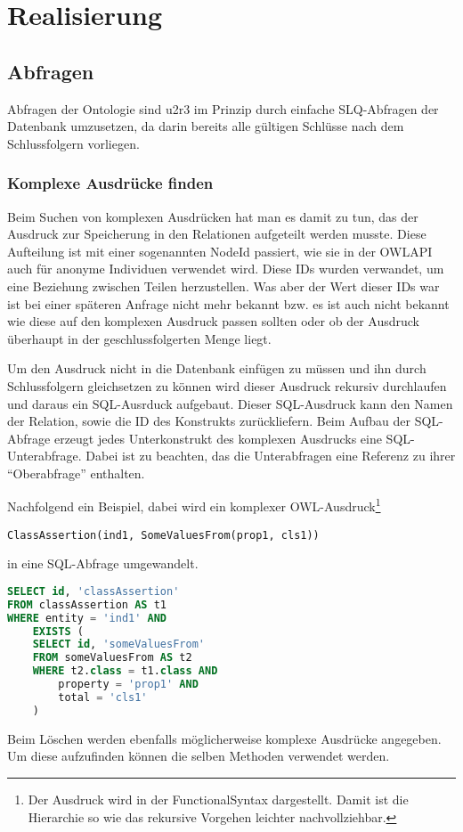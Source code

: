 \chapter{Realisierung}



\section{Abfragen}

Abfragen der Ontologie sind u2r3 im Prinzip durch einfache SLQ-Abfragen der Datenbank umzusetzen, da darin bereits alle gültigen Schlüsse nach dem Schlussfolgern vorliegen.

\subsection{Komplexe Ausdrücke finden}
Beim Suchen von komplexen Ausdrücken hat man es damit zu tun, das der Ausdruck zur Speicherung in den Relationen aufgeteilt werden musste. Diese Aufteilung ist mit einer sogenannten NodeId passiert, wie sie in der OWLAPI auch für anonyme Individuen verwendet wird. Diese IDs wurden verwandet, um eine Beziehung zwischen Teilen herzustellen. Was aber der Wert dieser IDs war ist bei einer späteren Anfrage nicht mehr bekannt bzw. es ist auch nicht bekannt wie diese auf den komplexen Ausdruck passen sollten oder ob der Ausdruck überhaupt in der geschlussfolgerten Menge liegt.

Um den Ausdruck nicht in die Datenbank einfügen zu müssen und ihn durch Schlussfolgern gleichsetzen zu können wird dieser Ausdruck rekursiv durchlaufen und daraus ein SQL-Ausrduck aufgebaut. Dieser SQL-Ausdruck kann den Namen der Relation, sowie die ID des Konstrukts zurückliefern. Beim Aufbau der SQL-Abfrage erzeugt jedes Unterkonstrukt des komplexen Ausdrucks eine SQL-Unterabfrage. Dabei ist zu beachten, das die Unterabfragen eine Referenz zu ihrer ``Oberabfrage'' enthalten.

Nachfolgend ein Beispiel, dabei wird ein komplexer OWL-Ausdruck\footnote{Der Ausdruck wird in der FunctionalSyntax dargestellt. Damit ist die Hierarchie so wie das rekursive Vorgehen leichter nachvollziehbar.}

\begin{verbatim}
ClassAssertion(ind1, SomeValuesFrom(prop1, cls1))
\end{verbatim}

in eine SQL-Abfrage umgewandelt.

\begin{lstlisting}[language=SQL]
SELECT id, 'classAssertion'
FROM classAssertion AS t1
WHERE entity = 'ind1' AND
	EXISTS (
	SELECT id, 'someValuesFrom'
	FROM someValuesFrom AS t2
	WHERE t2.class = t1.class AND
		property = 'prop1' AND
		total = 'cls1'
	)
\end{lstlisting}

Beim Löschen werden ebenfalls möglicherweise komplexe Ausdrücke angegeben. Um diese aufzufinden können die selben Methoden verwendet werden.





